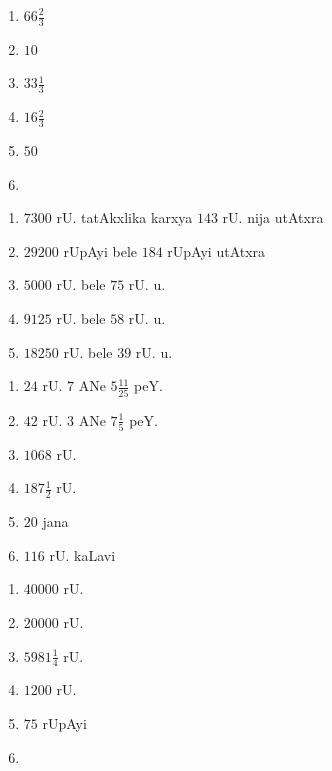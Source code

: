 
\begin{multicols}{3}
\begin{enumerate}[$(1)$]
\item $66\frac{2}{3}$
\item $10$
\item $33\frac{1}{3}$
\item $16 \frac{2}{3}$
\item $50$
\item[]
\end{enumerate}
\end{multicols}

\newpage
{}

\begin{multicols}{2}
\begin{enumerate}[$(1)$]
\item $7300$ rU. tatAkxlika karxya $143$ rU. nija utAtxra 
\item $29200$ rUpAyi bele  $184$ rUpAyi utAtxra 
\item $5000$ rU. bele $75$ rU. u. 
\item $9125$ rU. bele $58$ rU. u.
\item $18250$ rU. bele $39$ rU. u.
\end{enumerate}
\end{multicols}


\begin{multicols}{3}
\begin{enumerate}[$(1)$]
\item $24$ rU. $7$ ANe $5 \frac{11}{25}$ peY.
\item $42$ rU. $3$ ANe $7 \frac{1}{5}$ peY.
\item $1068$ rU. 
\item $187 \frac{1}{2}$ rU.
\item $20$ jana 
\item $116$ rU. kaLavi
\end{enumerate}
\end{multicols}


\begin{multicols}{3}
\begin{enumerate}[$(1)$]
\item $40000$ rU.
\item $20000$ rU.
\item $5981 \frac{1}{4}$ rU.
\item $1200$ rU.
\item $75$ rUpAyi
\item[]
\end{enumerate}
\end{multicols}

